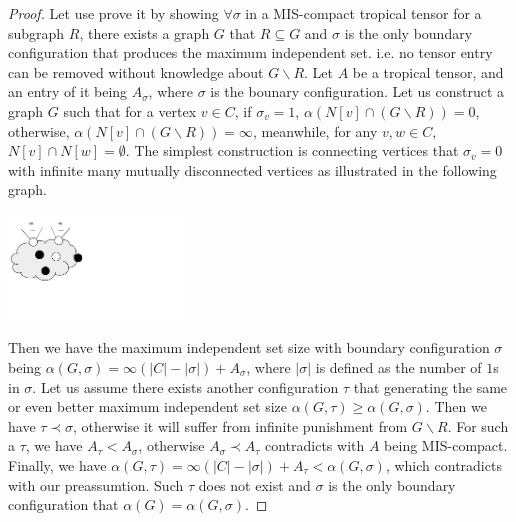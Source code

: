 \documentclass{article}
\newcommand{\<}{\langle}
\renewcommand{\>}{\rangle}
\theoremstyle{definition}\newtheorem{definition}{\textit{Definition}}
\begin{document}
\begin{proof}
    Let use prove it by showing $\forall \sigma$ in a MIS-compact tropical tensor for a subgraph $R$, there exists a graph $G$ that $R\subseteq G$ and $\sigma$ is the only boundary configuration that produces the maximum independent set.
    i.e. no tensor entry can be removed without knowledge about $G\backslash R$.
    Let $A$ be a tropical tensor, and an entry of it being $A_{\sigma}$, where $\sigma$ is the bounary configuration.
    Let us construct a graph $G$ such that for a vertex $v \in C$, if $\sigma_v=1$, $\alpha(N[v] \cap (G \backslash R)) = 0$, otherwise, $\alpha(N[v] \cap (G\backslash R)) = \infty$, meanwhile, for any $v, w \in C$, $N[v]\cap N[w] = \emptyset$.
    The simplest construction is connecting vertices that $\sigma_v=0$ with infinite many mutually disconnected vertices as illustrated in the following graph.

    \centerline{\includegraphics[width=0.35\textwidth, trim={0cm 2cm 6cm 0cm}, clip]{proofoptimal.pdf}}

    Then we have the maximum independent set size with boundary configuration $\sigma$ being $\alpha(G,\sigma) = \infty (|C|-|\sigma|) + A_{\sigma}$,
    where $|\sigma|$ is defined as the number of $1$s in $\sigma$.
    Let us assume there exists another configuration $\tau$ that generating the same or even better maximum independent set size $\alpha(G, \tau) \geq \alpha(G, \sigma)$.
    Then we have $\tau \prec \sigma$, otherwise it will suffer from infinite punishment from $G\backslash R$.
    For such a $\tau$, we have $A_\tau < A_\sigma$, otherwise $A_\sigma \prec A_\tau$ contradicts with $A$ being MIS-compact.
    Finally, we have $\alpha(G,\tau) = \infty (|C|-|\sigma|) + A_{\tau} < \alpha(G,\sigma)$, which contradicts with our preassumtion. Such $\tau$ does not exist and $\sigma$ is the only boundary configuration that $\alpha(G) = \alpha(G, \sigma)$.
\end{proof}
\end{document}
